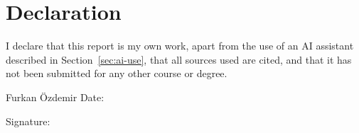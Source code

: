 \chapter*{Declaration}
I declare that this report is my own work, apart from the use of an AI assistant described in
Section~\ref{sec:ai-use}, that all sources used are cited, and that it has not been submitted
for any other course or degree.

\vspace{2cm}
\noindent Furkan Özdemir \hfill Date: \underline{\hspace{4cm}}

\noindent Signature: \underline{\hspace{5cm}}
